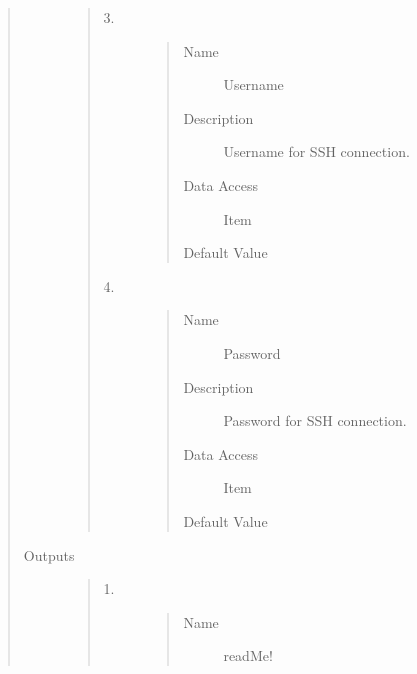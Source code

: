 \documentclass[letterpaper,10pt,english]{sphinxmanual}
\begin{document}
\begin{quote}
\begin{description}
\begin{quote}
\begin{description}
\item[{3.}] \leavevmode\begin{quote}\begin{description}
\item[{Name}] \leavevmode
Username

\item[{Description}] \leavevmode
Username for SSH connection.

\item[{Data Access}] \leavevmode
Item

\item[{Default Value}] \leavevmode
{}

\end{description}\end{quote}

\item[{4.}] \leavevmode\begin{quote}\begin{description}
\item[{Name}] \leavevmode
Password

\item[{Description}] \leavevmode
Password for SSH connection.

\item[{Data Access}] \leavevmode
Item

\item[{Default Value}] \leavevmode
{}

\end{description}\end{quote}

\end{description}\end{quote}

\item[{Outputs}] \leavevmode\begin{quote}\begin{description}
\item[{1.}] \leavevmode\begin{quote}\begin{description}
\item[{Name}] \leavevmode
readMe!


\end{description}
\end{quote}
\end{description}
\end{quote}
\end{description}
\end{quote}
\end{document}
